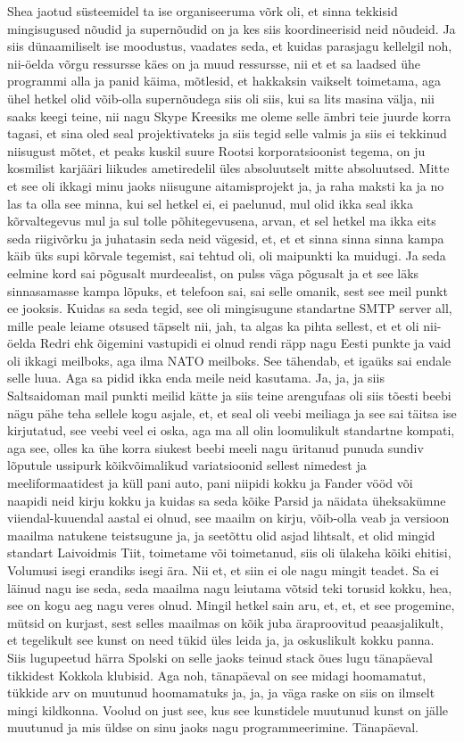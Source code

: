 Shea jaotud süsteemidel ta ise organiseeruma võrk oli, et sinna tekkisid mingisugused nõudid ja supernõudid on ja kes siis koordineerisid neid nõudeid. Ja siis dünaamiliselt ise moodustus, vaadates seda, et kuidas parasjagu kellelgil noh, nii-öelda võrgu ressursse käes on ja muud ressursse, nii et et sa laadsed ühe programmi alla ja panid käima, mõtlesid, et hakkaksin vaikselt toimetama, aga ühel hetkel olid võib-olla supernõudega siis oli siis, kui sa lits masina välja, nii saaks keegi teine, nii nagu Skype Kreesiks me oleme selle ämbri teie juurde korra tagasi, et sina oled seal projektivateks ja siis tegid selle valmis ja siis ei tekkinud niisugust mõtet, et peaks kuskil suure Rootsi korporatsioonist tegema, on ju kosmilist karjääri liikudes ametiredelil üles absoluutselt mitte absoluutsed. Mitte et see oli ikkagi minu jaoks niisugune aitamisprojekt ja, ja raha maksti ka ja no las ta olla see minna, kui sel hetkel ei, ei paelunud, mul olid ikka seal ikka kõrvaltegevus mul ja sul tolle põhitegevusena, arvan, et sel hetkel ma ikka eits seda riigivõrku ja juhatasin seda neid vägesid, et, et et sinna sinna sinna kampa käib üks supi kõrvale tegemist, sai tehtud oli, oli maipunkti ka muidugi. Ja seda eelmine kord sai põgusalt murdeealist, on pulss väga põgusalt ja et see läks sinnasamasse kampa lõpuks, et telefoon sai, sai selle omanik, sest see meil punkt ee jooksis. Kuidas sa seda tegid, see oli mingisugune standartne SMTP server all, mille peale leiame otsused täpselt nii, jah, ta algas ka pihta sellest, et et oli nii-öelda Redri ehk õigemini vastupidi ei olnud rendi räpp nagu Eesti punkte ja vaid oli ikkagi meilboks, aga ilma NATO meilboks. See tähendab, et igaüks sai endale selle luua. Aga sa pidid ikka enda meile neid kasutama. Ja, ja, ja siis Saltsaidoman mail punkti meilid kätte ja siis teine arengufaas oli siis tõesti beebi nägu pähe teha sellele kogu asjale, et, et seal oli veebi meiliaga ja see sai täitsa ise kirjutatud, see veebi veel ei oska, aga ma all olin loomulikult standartne kompati, aga see, olles ka ühe korra siukest beebi meeli nagu üritanud punuda sundiv lõputule ussipurk kõikvõimalikud variatsioonid sellest nimedest ja meeliformaatidest ja küll pani auto, pani niipidi kokku ja Fander vööd või naapidi neid kirju kokku ja kuidas sa seda kõike Parsid ja näidata üheksakümne viiendal-kuuendal aastal ei olnud, see maailm on kirju, võib-olla veab ja versioon maailma natukene teistsugune ja, ja seetõttu olid asjad lihtsalt, et olid mingid standart Laivoidmis Tiit, toimetame või toimetanud, siis oli ülakeha kõiki ehitisi, Volumusi isegi erandiks isegi ära. Nii et, et siin ei ole nagu mingit teadet. Sa ei läinud nagu ise seda, seda maailma nagu leiutama võtsid teki torusid kokku, hea, see on kogu aeg nagu veres olnud. Mingil hetkel sain aru, et, et, et see progemine, mütsid on kurjast, sest selles maailmas on kõik juba äraproovitud peaasjalikult, et tegelikult see kunst on need tükid üles leida ja, ja oskuslikult kokku panna. Siis lugupeetud härra Spolski on selle jaoks teinud stack õues lugu tänapäeval tikkidest Kokkola klubisid. Aga noh, tänapäeval on see midagi hoomamatut, tükkide arv on muutunud hoomamatuks ja, ja, ja väga raske on siis on ilmselt mingi kildkonna. Voolud on just see, kus see kunstidele muutunud kunst on jälle muutunud ja mis üldse on sinu jaoks nagu programmeerimine. Tänapäeval.
